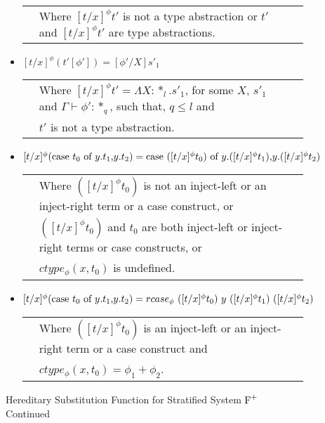 \begin{figure}[t]
\begin{itemize}
    \begin{tabular}{lll}
      & Where $[t/x]^\phi t'$ is not a type abstraction or
      $t'$ and $[t/x]^\phi t'$ are type abstractions.
    \end{tabular}
    \item[] $[t/x]^{\phi} (t'[\phi']) = [\phi'/X]s'_1$\\
      \begin{tabular}{lll}
        & Where $[t/x]^{\phi} t' = \Lambda X:*_l.s'_1$,
        for some $X$, $s'_1$ and $\Gamma \vdash \phi':*_q$, such that, $q \leq l$ and\\
	& $t'$ is not a type abstraction.
      \end{tabular}
    \item[] $[t/x]^{\phi} (\mbox{case}\ t_0\ \text{of}\ y\text{.}t_1\text{,}y\text{.}t_2) = 
      \mbox{case}\ ([t/x]^{\phi} t_0)\ \text{of}\ y\text{.}([t/x]^{\phi} t_1)\text{,}y\text{.}([t/x]^{\phi} t_2)$\\
      \begin{tabular}{lll}
        & Where $([t/x]^{\phi} t_0)$ is not an inject-left or an inject-right term or a case 
        construct, or\\
        & $([t/x]^{\phi} t_0)$ and $t_0$ are both inject-left or inject-right terms or case 
        constructs, or\\
        & $ctype_\phi(x,t_0)$ is undefined.
      \end{tabular}
    \item[] $[t/x]^{\phi} (\ccon{t_0}{y}{t_1}{t_2}) = 
      rcase_{\phi}\ ([t/x]^{\phi} t_0)\ y\ 
      ([t/x]^{\phi} t_1)\ ([t/x]^{\phi} t_2)$\\
      \begin{tabular}{lll}
        & Where $([t/x]^{\phi} t_0)$ is an inject-left or an inject-right term or 
        a case construct and\\
        & $ctype_\phi(x,t_0) = \phi_1+\phi_2$.
      \end{tabular}
  \end{itemize}
  \caption{Hereditary Substitution Function for Stratified System $\mbox{F}^{+}$ Continued}
  \label{fig:hereditary_substitution_function_part2}
\end{figure}

